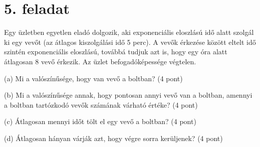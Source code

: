 \documentclass[a4paper,12pt]{article}   		%
\begin{document}
\section*{5. feladat}
Egy üzletben egyetlen eladó dolgozik, aki exponenciális eloszlású idő 
alatt szolgál ki egy vevőt (az átlagos kiszolgálási idő 5 perc). A vevők
érkezése között eltelt idő  szintén exponenciális eloszlású, továbbá 
tudjuk azt is, hogy egy óra alatt átlagosan 8 vevő érkezik. Az üzlet 
befogadóképessége végtelen.

(a) Mi a valószínűsége, hogy van vevő a boltban? (4 pont)

(b) Mi a valószínűsége annak, hogy pontosan annyi vevő van a boltban, 
amennyi a boltban tartózkodó vevők számának várható értéke? (4 pont)

(c) Átlagosan mennyi időt tölt el egy vevő a boltban? (4 pont)

(d) Átlagosan hányan várják azt, hogy végre sorra kerüljenek? (4 pont)
\end{document}
